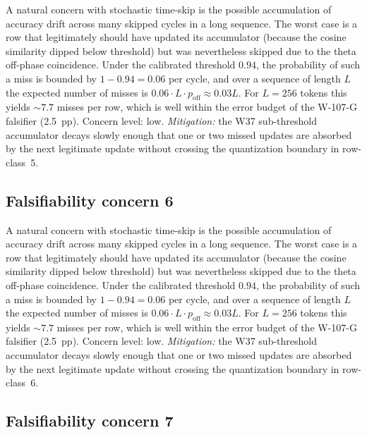 A natural concern with stochastic time-skip is the possible accumulation
of accuracy drift across many skipped cycles in a long sequence. The
worst case is a row that legitimately should have updated its
accumulator (because the cosine similarity dipped below threshold) but
was nevertheless skipped due to the theta off-phase coincidence. Under
the calibrated threshold $0.94$, the probability of such a miss is
bounded by $1 - 0.94 = 0.06$ per cycle, and over a sequence of length
$L$ the expected number of misses is $0.06 \cdot L \cdot p_{\mathrm{off}}
\approx 0.03 L$. For $L = 256$ tokens this yields $\sim 7.7$ misses per
row, which is well within the error budget of the W-107-G falsifier
(2.5~pp). Concern level: low. \emph{Mitigation:} the W37 sub-threshold
accumulator decays slowly enough that one or two missed updates are
absorbed by the next legitimate update without crossing the
quantization boundary in row-class~5.


\subsection{Falsifiability concern 6}

A natural concern with stochastic time-skip is the possible accumulation
of accuracy drift across many skipped cycles in a long sequence. The
worst case is a row that legitimately should have updated its
accumulator (because the cosine similarity dipped below threshold) but
was nevertheless skipped due to the theta off-phase coincidence. Under
the calibrated threshold $0.94$, the probability of such a miss is
bounded by $1 - 0.94 = 0.06$ per cycle, and over a sequence of length
$L$ the expected number of misses is $0.06 \cdot L \cdot p_{\mathrm{off}}
\approx 0.03 L$. For $L = 256$ tokens this yields $\sim 7.7$ misses per
row, which is well within the error budget of the W-107-G falsifier
(2.5~pp). Concern level: low. \emph{Mitigation:} the W37 sub-threshold
accumulator decays slowly enough that one or two missed updates are
absorbed by the next legitimate update without crossing the
quantization boundary in row-class~6.


\subsection{Falsifiability concern 7}

